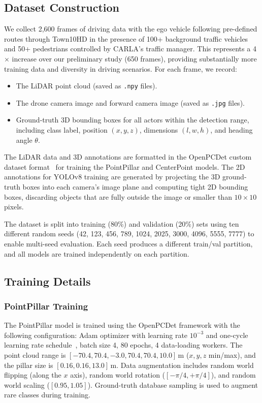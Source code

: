 \documentclass[sustainability,article,submit,moreauthors,pdftex]{Definitions/mdpi}
\begin{document}
\subsection{Dataset Construction}\label{sec:dataset}

We collect 2{,}600 frames of driving data with the ego vehicle following pre-defined routes through Town10HD in the presence of 100+ background traffic vehicles and 50+ pedestrians controlled by CARLA's traffic manager. This represents a 4$\times$ increase over our preliminary study (650 frames), providing substantially more training data and diversity in driving scenarios. For each frame, we record:

\begin{itemize}[leftmargin=*,labelsep=5.8mm]
\item The LiDAR point cloud (saved as \texttt{.npy} files).
\item The drone camera image and forward camera image (saved as \texttt{.jpg} files).
\item Ground-truth 3D bounding boxes for all actors within the detection range, including class label, position $(x, y, z)$, dimensions $(l, w, h)$, and heading angle $\theta$.
\end{itemize}

The LiDAR data and 3D annotations are formatted in the OpenPCDet custom dataset format~\cite{openpcdet2020} for training the PointPillar and CenterPoint models. The 2D annotations for YOLOv8 training are generated by projecting the 3D ground-truth boxes into each camera's image plane and computing tight 2D bounding boxes, discarding objects that are fully outside the image or smaller than $10 \times 10$ pixels.

The dataset is split into training (80\%) and validation (20\%) sets using ten different random seeds (42, 123, 456, 789, 1024, 2025, 3000, 4096, 5555, 7777) to enable multi-seed evaluation. Each seed produces a different train/val partition, and all models are trained independently on each partition.

\subsection{Training Details}

\subsubsection{PointPillar Training}

The PointPillar model is trained using the OpenPCDet framework with the following configuration: Adam optimizer with learning rate $10^{-3}$ and one-cycle learning rate schedule~\cite{lang2019pointpillars}, batch size 4, 80 epochs, 4 data-loading workers. The point cloud range is $[-70.4, 70.4, -3.0, 70.4, 70.4, 10.0]$\,m ($x, y, z$ min/max), and the pillar size is $[0.16, 0.16, 13.0]$\,m. Data augmentation includes random world flipping (along the $x$ axis), random world rotation ($[-\pi/4, +\pi/4]$), and random world scaling ($[0.95, 1.05]$). Ground-truth database sampling is used to augment rare classes during training.
\end{document}
